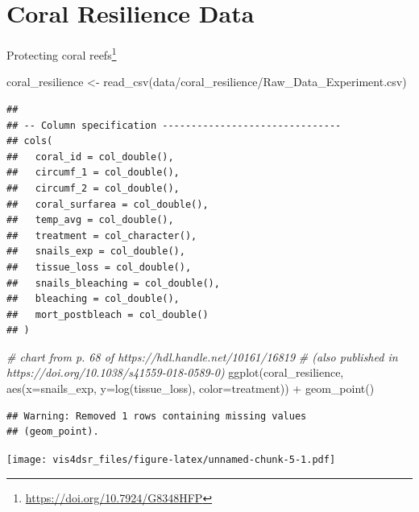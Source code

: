 \documentclass[
]{krantz}
\makeatletter
\newenvironment{Shaded}{\begin{snugshade}}{\end{snugshade}}
\newcommand{\AttributeTok}[1]{\textcolor[rgb]{0.61,0.61,0.61}{#1}}
\newcommand{\CommentTok}[1]{\textcolor[rgb]{0.37,0.37,0.37}{\textit{#1}}}
\newcommand{\FunctionTok}[1]{\textcolor[rgb]{0,0,0}{#1}}
\newcommand{\NormalTok}[1]{#1}
\newcommand{\OtherTok}[1]{\textcolor[rgb]{0.37,0.37,0.37}{#1}}
\newcommand{\SpecialCharTok}[1]{\textcolor[rgb]{0,0,0}{#1}}
\newcommand{\StringTok}[1]{\textcolor[rgb]{0.5,0.5,0.5}{#1}}
\renewcommand{\href}[2]{#2\footnote{\url{#1}}}
\newenvironment{kframe}{%
\medskip{}
\setlength{\fboxsep}{.8em}
 \def\at@end@of@kframe{}%
 \ifinner\ifhmode%
  \def\at@end@of@kframe{\end{minipage}}%
  \begin{minipage}{\columnwidth}%
 \fi\fi%
 \def\FrameCommand##1{\hskip\@totalleftmargin \hskip-\fboxsep
 \colorbox{shadecolor}{##1}\hskip-\fboxsep
     \hskip-\linewidth \hskip-\@totalleftmargin \hskip\columnwidth}%
 \MakeFramed {\advance\hsize-\width
   \@totalleftmargin\z@ \linewidth\hsize
   \@setminipage}}%
 {\par\unskip\endMakeFramed%
 \at@end@of@kframe}
\renewenvironment{Shaded}{\begin{kframe}}{\end{kframe}}
\makeatother
\begin{document}
\hypertarget{coral-resilience-data}{%
\section*{Coral Resilience Data}\label{coral-resilience-data}}


\href{https://doi.org/10.7924/G8348HFP}{Protecting coral reefs}

\begin{Shaded}
\begin{Highlighting}[]
\NormalTok{coral\_resilience }\OtherTok{\textless{}{-}} \FunctionTok{read\_csv}\NormalTok{(}\StringTok{\textquotesingle{}data/coral\_resilience/Raw\_Data\_Experiment.csv\textquotesingle{}}\NormalTok{)}
\end{Highlighting}
\end{Shaded}

\begin{verbatim}
## 
## -- Column specification -------------------------------
## cols(
##   coral_id = col_double(),
##   circumf_1 = col_double(),
##   circumf_2 = col_double(),
##   coral_surfarea = col_double(),
##   temp_avg = col_double(),
##   treatment = col_character(),
##   snails_exp = col_double(),
##   tissue_loss = col_double(),
##   snails_bleaching = col_double(),
##   bleaching = col_double(),
##   mort_postbleach = col_double()
## )
\end{verbatim}

\begin{Shaded}
\begin{Highlighting}[]
\CommentTok{\# chart from p. 68 of https://hdl.handle.net/10161/16819 }
\CommentTok{\#   (also published in https://doi.org/10.1038/s41559{-}018{-}0589{-}0)}
\FunctionTok{ggplot}\NormalTok{(coral\_resilience, }\FunctionTok{aes}\NormalTok{(}\AttributeTok{x=}\NormalTok{snails\_exp, }\AttributeTok{y=}\FunctionTok{log}\NormalTok{(tissue\_loss), }\AttributeTok{color=}\NormalTok{treatment)) }\SpecialCharTok{+} \FunctionTok{geom\_point}\NormalTok{()}
\end{Highlighting}
\end{Shaded}

\begin{verbatim}
## Warning: Removed 1 rows containing missing values
## (geom_point).
\end{verbatim}

\texttt{[image: vis4dsr\_files/figure-latex/unnamed-chunk-5-1.pdf]}
\end{document}
